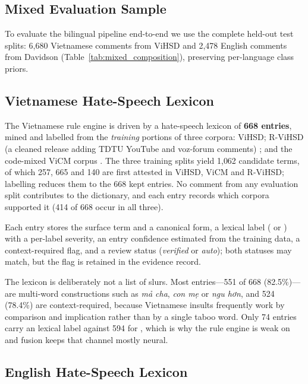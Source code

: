\subsection{Mixed Evaluation Sample}
\label{sec:mixed_sample}

To evaluate the bilingual pipeline end-to-end we use the complete held-out test
splits: 6{,}680 Vietnamese comments from ViHSD and 2{,}478 English comments from
Davidson (Table~\ref{tab:mixed_composition}), preserving per-language class priors.



\subsection{Vietnamese Hate-Speech Lexicon}
\label{sec:lexicon_vi}

The Vietnamese rule engine is driven by a hate-speech lexicon of \textbf{668
entries}, mined and labelled from the \emph{training} portions of three
corpora: ViHSD; R-ViHSD (a cleaned release adding TDTU YouTube and voz-forum
comments) \cite{bontoriTdtu}; and the code-mixed ViCM corpus
\cite{nguyen2026vicm}.  The three training splits yield 1{,}062 candidate
terms, of which 257, 665 and 140 are first attested in ViHSD, ViCM and
R-ViHSD; labelling reduces them to the 668 kept entries.  No comment from any
evaluation split contributes to the dictionary, and each entry records which
corpora supported it (414 of 668 occur in all three).

Each entry stores the surface term and a canonical form, a lexical label
(\hate{} or \off{}) with a per-label severity, an entry confidence estimated
from the training data, a context-required flag, and a review status
(\emph{verified} or \emph{auto}); both statuses may match, but the flag is
retained in the evidence record.

The lexicon is deliberately not a list of slurs.  Most entries---551 of 668
(82.5\%)---are multi-word constructions such as \emph{mả cha}, \emph{con mẹ}
or \emph{ngu hơn}, and 524 (78.4\%) are context-required, because Vietnamese
insults frequently work by comparison and implication rather than by a single
taboo word.  Only 74 entries carry an \off{} lexical label against 594 for
\hate{}, which is why the rule engine is weak on \off{} and fusion keeps that
channel mostly neural.

\subsection{English Hate-Speech Lexicon}
\label{sec:lexicon_en}

